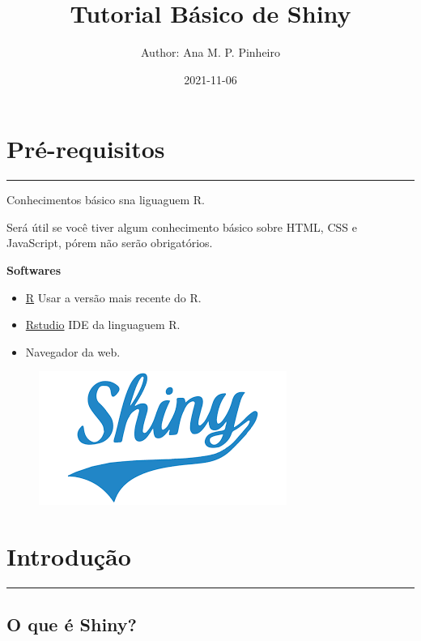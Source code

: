 \documentclass[
]{book}
\title{Tutorial Básico de Shiny}
\author{Author: Ana M. P. Pinheiro}
\date{2021-11-06}
\providecommand{\tightlist}{%
  \setlength{\itemsep}{0pt}\setlength{\parskip}{0pt}}
\begin{document}
\maketitle

{
\setcounter{tocdepth}{1}
\tableofcontents
}
\hypertarget{pruxe9-requisitos}{%
\chapter*{Pré-requisitos}\label{pruxe9-requisitos}}

\begin{center}\rule{0.5\linewidth}{0.5pt}\end{center}

Conhecimentos básico sna liguaguem R.

Será útil se você tiver algum conhecimento básico sobre HTML, CSS e JavaScript, pórem não serão obrigatórios.

\textbf{Softwares}

\begin{itemize}
\tightlist
\item
  \href{https://www.r-project.org/}{R} Usar a versão mais recente do R.
\item
  \href{https://www.rstudio.com/}{Rstudio} IDE da linguaguem R.
\item
  Navegador da web.
\end{itemize}

\begin{figure}

{\centering \includegraphics[width=0.3\linewidth]{www/img/shiny} 

}

\end{figure}

\hypertarget{introduuxe7uxe3o}{%
\chapter{Introdução}\label{introduuxe7uxe3o}}

\begin{center}\rule{0.5\linewidth}{0.5pt}\end{center}

\hypertarget{o-que-uxe9-shiny}{%
\section{\texorpdfstring{\textbf{O que é Shiny?}}{O que é Shiny?}}\label{o-que-uxe9-shiny}}
\end{document}
